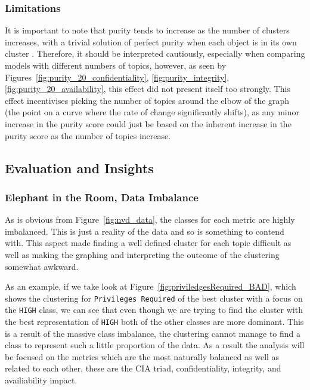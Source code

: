 \documentclass[12pt]{article}
\begin{document}
\subsubsection{Limitations}

It is important to note that purity tends to increase as the number of clusters increases, with a
trivial solution of perfect purity when each object is in its own cluster \cite{v-measure}.
Therefore, it should be interpreted cautiously, especially when comparing models with different
numbers of topics, however, as seen by Figures~\ref{fig:purity_20_confidentiality}, \ref{fig:purity_integrity},
\ref{fig:purity_20_availability}, this effect did not present
itself too strongly. This effect incentivises picking the number of topics around the elbow of the
graph (the point on a curve where the rate of change significantly shifts), as any minor increase in
the purity score could just be based on the inherent increase in the purity score as the number of
topics increase.


\subsection{Evaluation and Insights}

\subsubsection{Elephant in the Room, Data Imbalance}

As is obvious from Figure~\ref{fig:nvd_data}, the classes for each metric are highly imbalanced.
This is just a reality of the data and so is something to contend with. This aspect
made finding a well defined cluster for each topic difficult as well as making the graphing and
interpreting the outcome of the clustering somewhat awkward.

As an example, if we take look at Figure~\ref{fig:priviledgesRequired_BAD}, which shows the
clustering for \texttt{Privileges Required}  of the best cluster with a focus on the \texttt{HIGH} class, we
can see that even though we are trying to find the cluster with the best representation of
\texttt{HIGH} both of the other classes are more dominant. This is a result of the massive class
imbalance, the clustering cannot manage to find a class to represent such a little proportion of the
data. As a result the analysis will be focused on the metrics which are the most naturally balanced
as well as related to each other, these are the CIA triad, confidentiality, integrity, and availiability
impact.
\end{document}
